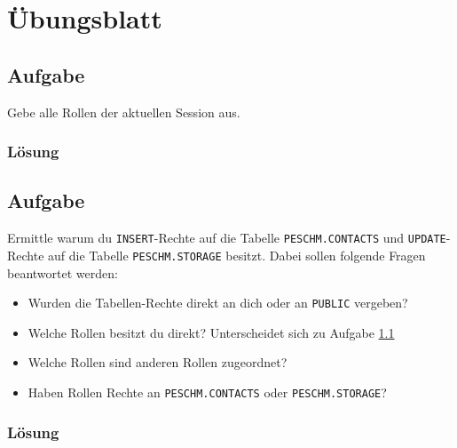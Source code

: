 \section{Übungsblatt}
\label{sec:uebung_03}

\subsection{Aufgabe}
\label{sec:uebung_03.aufgabe_01}
Gebe alle Rollen der aktuellen Session aus.

\subsubsection*{Lösung}
\label{sec:uebung_03.aufgabe_01.loesung}

\subsection{Aufgabe}
\label{sec:uebung_03.aufgabe_02}
Ermittle warum du \texttt{INSERT}-Rechte auf die Tabelle \texttt{PESCHM.CONTACTS} und \texttt{UPDATE}-Rechte auf die Tabelle \texttt{PESCHM.STORAGE} besitzt.
Dabei sollen folgende Fragen beantwortet werden:

\begin{itemize}[itemsep=0pt]
  \item Wurden die Tabellen-Rechte direkt an dich oder an \texttt{PUBLIC} vergeben?
  \item Welche Rollen besitzt du direkt? Unterscheidet sich zu Aufgabe \ref{sec:uebung_03.aufgabe_01}
  \item Welche Rollen sind anderen Rollen zugeordnet?
  \item Haben Rollen Rechte an \texttt{PESCHM.CONTACTS} oder \texttt{PESCHM.STORAGE}?
\end{itemize}

\subsubsection*{Lösung}
\label{sec:uebung_03.aufgabe_02.loesung}

